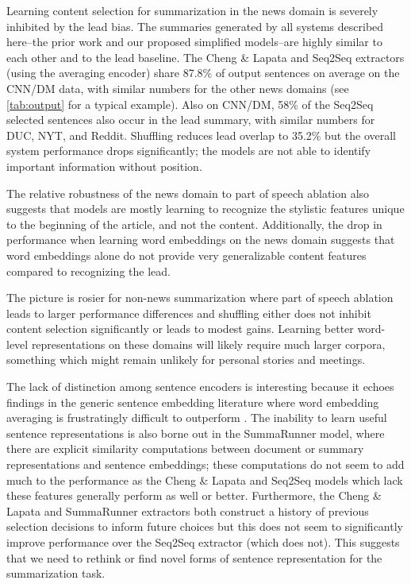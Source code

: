 
Learning content selection for summarization in the news domain is severely inhibited by the lead bias. 
The summaries generated by all systems described here--the prior work and our proposed simplified models--are highly similar to each other and to the lead 
baseline. The Cheng \& Lapata and Seq2Seq 
extractors (using the averaging encoder) share 87.8\% of output sentences on average on the CNN/DM data,
with similar numbers for the other news domains (see \autoref{tab:output}
for a typical example).  
Also on CNN/DM, 58\% of the Seq2Seq %
selected sentences also occur
in the lead summary, with similar numbers for DUC, NYT, and Reddit. Shuffling
reduces lead overlap to 35.2\% but the overall system performance drops
    significantly; the models are not able to identify important information
    without position.
    
    The relative robustness of the news domain to part of speech ablation also 
    suggests that models are mostly learning to recognize the stylistic 
    features unique to the beginning of the article, and not the content.
    Additionally, the drop in performance when learning word embeddings on 
    the news domain suggests that word embeddings alone do not provide 
    very generalizable content features compared to recognizing the lead.

The picture is rosier for non-news summarization where part of speech ablation leads
to larger performance differences and shuffling either does not inhibit content
selection significantly or leads to modest gains. Learning better
word-level representations on these domains will likely require much
larger corpora, something which might remain unlikely for personal stories
and meetings.



The lack of distinction among sentence encoders is interesting because 
it echoes findings in the generic sentence embedding literature 
where word embedding averaging is frustratingly difficult to 
outperform  \cite{iyyer2015deep,wieting2015towards,arora2016simple,wieting2017revisiting}.
The inability to learn useful sentence representations is also 
borne out in the 
SummaRunner model, where there are explicit similarity computations
between document or summary representations and sentence embeddings;
these computations do not seem to add much to the performance as the 
Cheng \& Lapata and Seq2Seq models which lack these features generally
perform as well or better.
Furthermore, the Cheng \& Lapata and SummaRunner extractors both construct
a history of previous selection decisions to inform future choices but this
does not seem to significantly improve performance over the Seq2Seq extractor 
(which does not). This suggests that we need to rethink or find novel forms 
of sentence representation for the summarization task.


